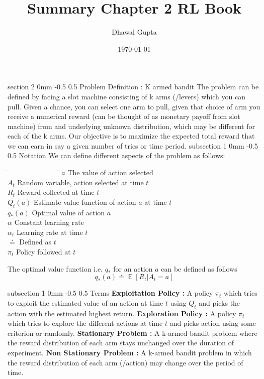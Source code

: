 \documentclass[twocolumn,11pt]{article}
\title{Summary Chapter 2 RL Book \cite{sutton2018reinforcement}}
\author{Dhawal Gupta}
\date{\today}
\makeatletter
\DeclareMathOperator{\E}{\mathbb{E}}
\renewcommand{\section}{\@startsection
{section}%
{2}%
{0mm}%
{-0.5\baselineskip}%
{0.5\baselineskip}%
{\bfseries\color{blue}}} %
\renewcommand{\subsection}{\@startsection
{subsection}%
{1}%
{0mm}%
{-0.5\baselineskip}%
{0.5\baselineskip}%
{\bfseries\color{blue}}} %
\makeatother
\begin{document}
\maketitle
\section{Problem Definition : K armed bandit}
The problem can be defined by facing a slot machine consisting of k arms (/levers) which you can pull. Given a chance, you can select one arm to pull, given that choice  of arm you receive a numerical reward (can be thought of as monetary payoff from slot machine) from and underlying unknown distribution, which may be different for each of the k arms. Our objective is to maximize the expected total reward that we can earn in say a given number of tries or time period. 
\subsection{Notation}
We can define different aspects of the problem as follows:
\noindent
\begin{tabbing}
\=~~~~~~~~~~~~~~  \= \kill
\>$a$   \>The value of action selected \\
\>$A_t$    \>Random variable, action selected at time $t$\\
\>$R_t $    \>Reward collected at time $t$\\
\>$Q_t(a)$    \>Estimate value function of action $a$ at time $t$\\
\>$q_*(a)$    \>Optimal value of action $a$\\
\>$\alpha$    \>Constant learning rate\\
\>$\alpha_t$    \> Learning rate at time $t$\\
\>$\doteq$    \>Defined as $t$\\
\>$\pi_t$    \>Policy followed at $t$\\
\end{tabbing}
The optimal value function i.e. $q_*$ for an action $a$ can be defined as follows\useshortskip
\begin{equation}
    q_*(a) \doteq \E[R_t| A_t = a]
\end{equation}

\subsection{Terms}
\textbf{Exploitation Policy :} A policy $\pi_t$ which tries to exploit the estimated value of an action at time $t$ using $Q_t$ and picks the action with the estimated highest return.\newline
\textbf{Exploration Policy :} A policy $\pi_t$ which tries to explore the  different actions at time $t$ and picks action using some criterion or randomly.\newline
\textbf{Stationary Problem : } A k-armed bandit problem where the reward distribution of each arm stays unchanged over the duration of experiment.\newline
\textbf{Non Stationary Problem :} A k-armed bandit problem in which the reward distribution of each arm (/action) may change over the period of time.
\end{document}
